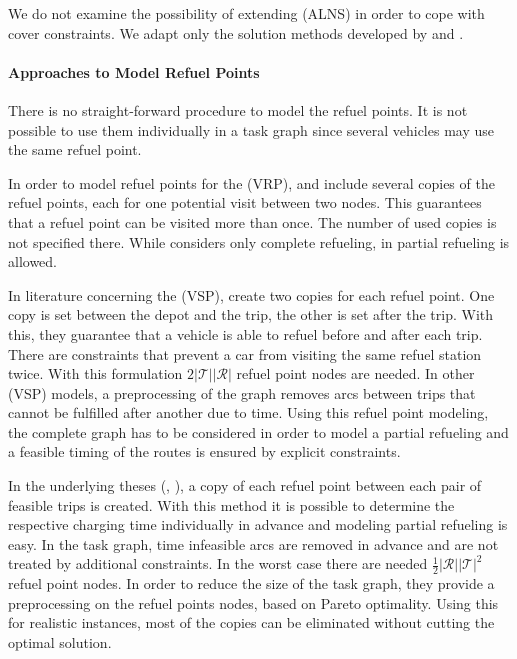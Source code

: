 We do not examine the possibility of extending (ALNS) in order to cope with cover constraints. We adapt only the solution methods developed by \cite{Kaiser} and \cite{Knoll}.

\paragraph{Approaches to Model Refuel Points} \parfill

There is no straight-forward procedure to model the refuel points. It is not possible to use them individually in a task graph since several vehicles may use the same refuel point.

In order to model refuel points for the (VRP), \cite{Erdogan_Miller-Hooks} and \cite{Felipe} include several copies of the refuel points, each for one potential visit between two nodes. This guarantees that a refuel point can be visited more than once. The number of used copies is not specified there. While \cite{Erdogan_Miller-Hooks} considers only complete refueling, in \cite{Felipe} partial refueling is allowed.

In literature concerning the (VSP), \cite{Wen} create two copies for each refuel point. One copy is set between the depot and the trip, the other is set after the trip. With this, they guarantee that a vehicle is able to refuel before and after each trip. There are constraints that prevent a car from visiting the same refuel station twice. With this formulation $2|\mathcal{T}||\mathcal{R}|$ refuel point nodes are needed. In other (VSP) models, a preprocessing of the graph removes arcs between trips that cannot be fulfilled after another due to time. Using this refuel point modeling, the complete graph has to be considered in order to model a partial refueling and a feasible timing of the routes is ensured by explicit constraints.

In the underlying theses (\cite{Kaiser}, \cite{Knoll}), a copy of each refuel point between each pair of feasible trips is created. With this method it is possible to determine the respective charging time individually in advance and modeling partial refueling is easy. In the task graph, time infeasible arcs are removed in advance and are not treated by additional constraints. In the worst case there are needed ${\frac{1}{2}|\mathcal{R}||\mathcal{T}|^2}$ refuel point nodes. In order to reduce the size of the task graph, they provide a preprocessing on the refuel points nodes, based on Pareto optimality. Using this for realistic instances, most of the copies can be eliminated without cutting the optimal solution.